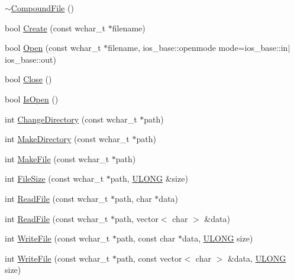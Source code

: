\begin{DoxyCompactItemize}
\hyperlink{class_y_compound_files_1_1_compound_file_a828355b586c4936e4dbae3f3439d66aa}{$\sim$\+Compound\+File} ()
\item 
bool \hyperlink{class_y_compound_files_1_1_compound_file_a02dbf71e18675f6dcbe2e9a7b3bca189}{Create} (const wchar\+\_\+t $\ast$filename)
\item 
bool \hyperlink{class_y_compound_files_1_1_compound_file_a297267446c654c3361e89592d85c1563}{Open} (const wchar\+\_\+t $\ast$filename, ios\+\_\+base\+::openmode mode=ios\+\_\+base\+::in$\vert$ios\+\_\+base\+::out)
\item 
bool \hyperlink{class_y_compound_files_1_1_compound_file_ab483c310646b994a1948cd463c70ab50}{Close} ()
\item 
bool \hyperlink{class_y_compound_files_1_1_compound_file_aa9b06c1eb80ad96cb0fcde1a4746d474}{Is\+Open} ()
\item 
int \hyperlink{class_y_compound_files_1_1_compound_file_ac87beb0f14a5e4e4576b8b2f81009a5c}{Change\+Directory} (const wchar\+\_\+t $\ast$path)
\item 
int \hyperlink{class_y_compound_files_1_1_compound_file_af9055cd718f70d9c907c020144ce197d}{Make\+Directory} (const wchar\+\_\+t $\ast$path)
\item 
int \hyperlink{class_y_compound_files_1_1_compound_file_a59e8cdb9298793896c27fb13637eae93}{Make\+File} (const wchar\+\_\+t $\ast$path)
\item 
int \hyperlink{class_y_compound_files_1_1_compound_file_a61916e4b689eed64e37e3fa274d97734}{File\+Size} (const wchar\+\_\+t $\ast$path, \hyperlink{_basic_excel_8hpp_abe09d1bea023be6a07cbadde8e955435}{U\+L\+O\+N\+G} \&size)
\item 
int \hyperlink{class_y_compound_files_1_1_compound_file_a0b4e9f62504461a07d74ee10febfee2e}{Read\+File} (const wchar\+\_\+t $\ast$path, char $\ast$data)
\item 
int \hyperlink{class_y_compound_files_1_1_compound_file_a6b888bccad8d92a486e8f25b01a4b170}{Read\+File} (const wchar\+\_\+t $\ast$path, vector$<$ char $>$ \&data)
\item 
int \hyperlink{class_y_compound_files_1_1_compound_file_a554fb5c28f9c4d1d42f33f99583a4967}{Write\+File} (const wchar\+\_\+t $\ast$path, const char $\ast$data, \hyperlink{_basic_excel_8hpp_abe09d1bea023be6a07cbadde8e955435}{U\+L\+O\+N\+G} size)
\item 
int \hyperlink{class_y_compound_files_1_1_compound_file_a73c89efa6826bf8051ed419fdaa3d289}{Write\+File} (const wchar\+\_\+t $\ast$path, const vector$<$ char $>$ \&data, \hyperlink{_basic_excel_8hpp_abe09d1bea023be6a07cbadde8e955435}{U\+L\+O\+N\+G} size)

\end{DoxyCompactItemize}
